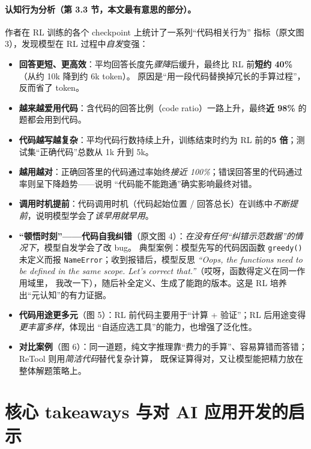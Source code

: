 \documentclass[11pt,UTF8,fontset=fandol]{ctexart}
\begin{document}
\paragraph{认知行为分析（第 3.3 节，本文最有意思的部分）。} 作者在 RL 训练的各个 checkpoint 上统计了一系列“代码相关行为”
指标（原文图 3），发现模型在 RL 过程中\emph{自发}变强：
\begin{itemize}[leftmargin=1.6em,itemsep=2pt]
  \item \textbf{回答更短、更高效}：平均回答长度先\emph{骤降}后缓升，最终比 RL 前\textbf{短约 40\%}（从约 10k 降到约 6k token）。
  原因是“用一段代码替换掉冗长的手算过程”，反而省了 token。
  \item \textbf{越来越爱用代码}：含代码的回答比例（code ratio）一路上升，最终\textbf{近 98\%} 的题都会用到代码。
  \item \textbf{代码越写越复杂}：平均代码行数持续上升，训练结束时约为 RL 前的\textbf{5 倍}；测试集“正确代码”总数从 1k 升到 5k。
  \item \textbf{越用越对}：正确回答里的代码通过率始终\emph{接近 100\%}；错误回答里的代码通过率则呈下降趋势——说明
  “代码能不能跑通”确实影响最终对错。
  \item \textbf{调用时机提前}：代码调用时机（代码起始位置 / 回答总长）在训练中\emph{不断提前}，说明模型学会了\emph{该早用就早用}。
  \item \textbf{“顿悟时刻”——代码自我纠错}（原文图 4）：\emph{在没有任何“纠错示范数据”的情况下}，模型自发学会了改 bug。
  典型案例：模型先写的代码因函数 \texttt{greedy()} 未定义而报 \texttt{NameError}；收到报错后，模型反思
  \emph{“Oops, the functions need to be defined in the same scope. Let's correct that.”}（哎呀，函数得定义在同一作用域里，
  我改一下），随后补全定义、生成了能跑的版本。这是 RL 培养出“元认知”的有力证据。
  \item \textbf{代码用途更多元}（图 5）：RL 前代码主要用于“计算 + 验证”；RL 后用途变得\emph{更丰富多样}，体现出
  “自适应选工具”的能力，也增强了泛化性。
  \item \textbf{对比案例}（图 6）：同一道题，纯文字推理靠“费力的手算”、容易算错而答错；ReTool 则用\emph{简洁代码}替代复杂计算，
  既保证算得对，又让模型能把精力放在整体解题策略上。
\end{itemize}

\section{核心 takeaways 与对 AI 应用开发的启示}
\end{document}
